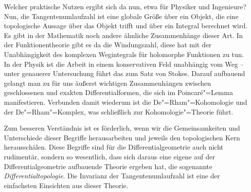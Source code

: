 Welcher praktische Nutzen ergibt sich da nun, etwa für Physiker und
Ingenieure?  Nun, die Tangentenumlaufzahl ist eine globale Größe
über ein Objekt, die eine topologische Aussage über das Objekt
trifft und über ein Integral berechnet wird. Es gibt in der Mathematik
noch andere ähnliche Zusammenhänge dieser Art. In der
Funktionentheorie gibt es da die Windungszahl, diese hat mit
der Unabhängigkeit des komplexen Wegintegrals für holomorphe
Funktionen zu tun. In der Physik ist die Arbeit in einem konservativen
Feld unabhängig vom Weg -- unter genauerer Untersuchung führt das zum
Satz von Stokes. Darauf aufbauend gelangt man zu für uns äußerst
wichtigen Zusammenhängen zwischen geschlossenen und exakten
Differentialformen, die sich im Poincaré"=Lemma manifestieren.
Verbunden damit wiederum ist die De"=Rham"=Kohomologie und der
De"=Rham"=Komplex, was schließlich zur Kohomologie"=Theorie führt.

Zum besseren Verständnis ist es förderlich, wenn wir die
Gemeinsamkeiten und Unterschiede dieser Begriffe herausarbeiten
und jeweils den topologischen Kern herausschälen.
Diese Begriffe sind für die Differentialgeometrie auch nicht
rudimentär, sondern so wesentlich, dass sich daraus eine eigene
auf der Differentialgeometrie aufbauende Theorie ergeben hat,
die sogenannte \emph{Differentialtopologie}. Die Invarianz der
Tangentenumlaufzahl ist eine der einfachsten Einsichten aus
dieser Theorie.




